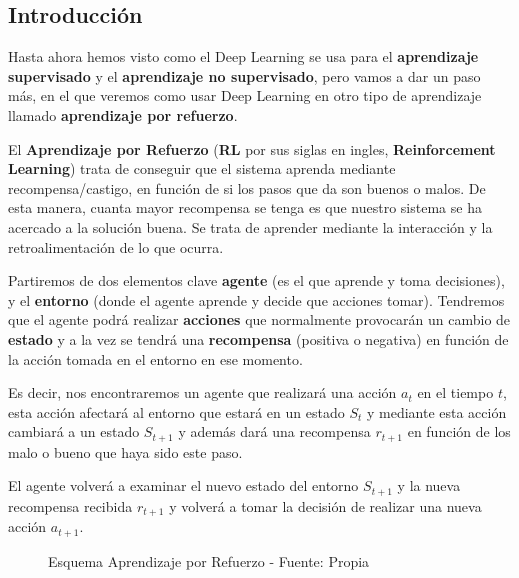 \documentclass[
  a4paper,
  DIV=11,
  numbers=noendperiod]{scrreprt}
\begin{document}
\subsection{Introducción}\label{introducciuxf3n-3}

Hasta ahora hemos visto como el Deep Learning se usa para el
\textbf{aprendizaje supervisado} y el \textbf{aprendizaje no
supervisado}, pero vamos a dar un paso más, en el que veremos como usar
Deep Learning en otro tipo de aprendizaje llamado \textbf{aprendizaje
por refuerzo}.

El \textbf{Aprendizaje por Refuerzo} (\textbf{RL} por sus siglas en
ingles, \textbf{Reinforcement Learning}) trata de conseguir que el
sistema aprenda mediante recompensa/castigo, en función de si los pasos
que da son buenos o malos. De esta manera, cuanta mayor recompensa se
tenga es que nuestro sistema se ha acercado a la solución buena. Se
trata de aprender mediante la interacción y la retroalimentación de lo
que ocurra.

Partiremos de dos elementos clave \textbf{agente} (es el que aprende y
toma decisiones), y el \textbf{entorno} (donde el agente aprende y
decide que acciones tomar). Tendremos que el agente podrá realizar
\textbf{acciones} que normalmente provocarán un cambio de
\textbf{estado} y a la vez se tendrá una \textbf{recompensa} (positiva o
negativa) en función de la acción tomada en el entorno en ese momento.

Es decir, nos encontraremos un agente que realizará una acción \(a_t\)
en el tiempo \(t\), esta acción afectará al entorno que estará en un
estado \(S_t\) y mediante esta acción cambiará a un estado \(S_{t+1}\) y
además dará una recompensa \(r_{t+1}\) en función de los malo o bueno
que haya sido este paso.

El agente volverá a examinar el nuevo estado del entorno \(S_{t+1}\) y
la nueva recompensa recibida \(r_{t+1}\) y volverá a tomar la decisión
de realizar una nueva acción \(a_{t+1}\).

\begin{figure}


\caption{\label{fig-rl_diagrama}Esquema Aprendizaje por Refuerzo -
Fuente: Propia}

\end{figure}%
\end{document}

